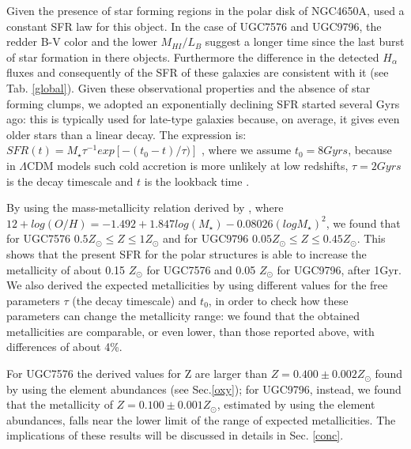 \documentclass{aa}
\begin{document}
Given the presence of star forming regions in the polar disk of
NGC4650A, \cite{Spav10} used a constant SFR law for this object. In
the case of UGC7576 and UGC9796, the redder B-V color and the
  lower $M_{HI}/L_{B}$ suggest a longer time since the last burst of
  star formation in there objects. Furthermore the difference in the
  detected $H_{\alpha}$ fluxes and consequently of the SFR of these
  galaxies are consistent with it (see Tab. \ref{global}).  Given
  these observational properties and the absence of star forming
  clumps, we adopted an exponentially declining SFR started several
  Gyrs ago: this is typically used for late-type galaxies because, on
  average, it gives even older stars than a linear decay. The
  expression is: $SFR(t) = M_{\star}\tau^{-1}exp[-(t_{0}-t)/\tau)]$ ,
  where we assume $t_{0} = 8 Gyrs$, because in $\Lambda$CDM models
  such cold accretion is more unlikely at low redshifts, $\tau =
  2Gyrs$ is the decay timescale and $t$ is the lookback time
  \citep{Bru03}.

 By using the mass-metallicity relation derived
  by \cite{Tre04}, where $12+log(O/H) = -1.492 + 1.847 log(M_{\star})
  - 0.08026 (log M_{\star})^{2}$, we found that for UGC7576 $0.5
  Z_{\odot} \le Z \le 1 Z_{\odot}$ and for UGC9796 $0.05 Z_{\odot} \le
  Z \le 0.45 Z_{\odot}$. This shows that the present SFR for the polar
  structures is able to increase the metallicity of about 0.15
  $Z_{\odot}$ for UGC7576 and 0.05 $Z_{\odot}$ for UGC9796, after
  1Gyr. We also derived the expected metallicities by using different
  values for the free parameters $\tau$ (the decay timescale) and
  $t_{0}$, in order to check how these parameters can change the
  metallicity range: we found that the obtained metallicities are
  comparable, or even lower, than those reported above, with
  differences of about 4\%.

For UGC7576 the derived values for Z are larger than {\bf $Z=0.400 \pm
  0.002 Z_{\odot}$} found by using the element abundances (see
  Sec.\ref{oxy}); for UGC9796, instead, we found that the metallicity
  of {\bf $Z=0.100 \pm 0.001 Z_{\odot}$}, estimated by using the element
  abundances, falls near the lower limit of the range of expected
  metallicities. The implications of these results will be discussed
  in details in Sec. \ref{conc}.
\end{document}
